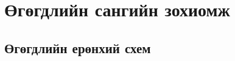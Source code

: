 \chapter{Өгөгдлийн сангийн зохиомж}
\label{chap:intro}
\section{Өгөгдлийн ерөнхий схем }


\newpage
